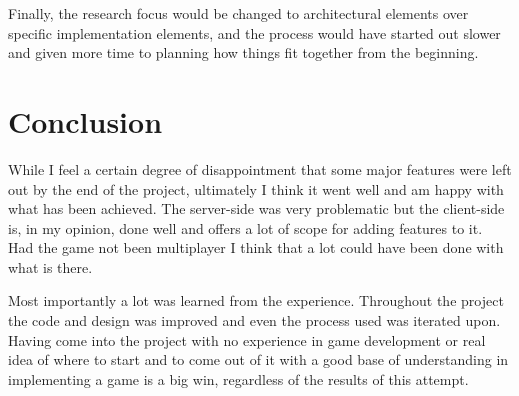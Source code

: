 Finally, the research focus would be changed to architectural elements over specific implementation elements, and the process would have started out slower and given more time to planning how things fit together from the beginning.

\section{Conclusion}
While I feel a certain degree of disappointment that some major features were left out by the end of the project, ultimately I think it went well and am happy with what has been achieved. The server-side was very problematic but the client-side is, in my opinion, done well and offers a lot of scope for adding features to it. Had the game not been multiplayer I think that a lot could have been done with what is there.

Most importantly a lot was learned from the experience. Throughout the project the code and design was improved and even the process used was iterated upon. Having come into the project with no experience in game development or real idea of where to start and to come out of it with a good base of understanding in implementing a game is a big win, regardless of the results of this attempt.





